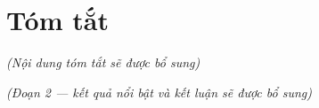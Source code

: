\chapter*{Tóm tắt}
\textit{(Nội dung tóm tắt sẽ được bổ sung)}

\textit{(Đoạn 2 — kết quả nổi bật và kết luận sẽ được bổ sung)}
